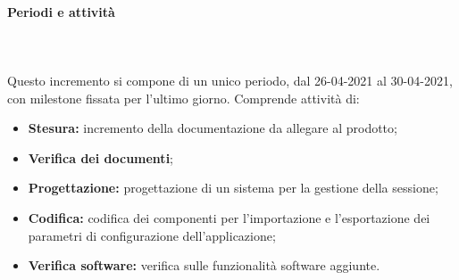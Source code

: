 \paragraph{Periodi e attività} \mbox{}\\\mbox{}\\
Questo incremento si compone di un unico periodo, dal  26-04-2021 al 30-04-2021, con milestone fissata per l'ultimo giorno. Comprende attività di:	
\begin{itemize}
\item \textbf{Stesura:} incremento della documentazione da allegare al prodotto;
\item \textbf{Verifica dei documenti};
\item \textbf{Progettazione:} progettazione di un sistema per la gestione della sessione;
\item \textbf{Codifica:} codifica dei componenti per l'importazione e l'esportazione dei parametri di configurazione dell'applicazione;
\item \textbf{Verifica software:} verifica sulle funzionalità software aggiunte.
\end{itemize}
%
%

